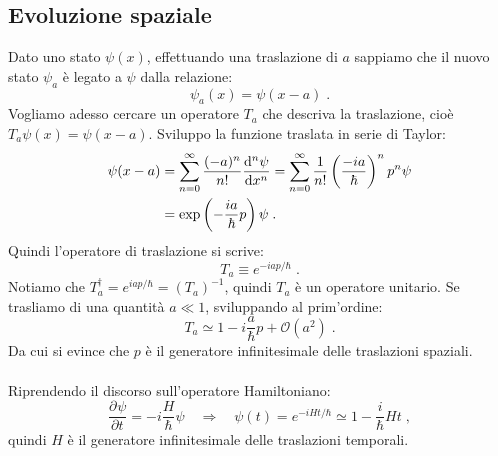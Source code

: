 \documentclass[12pt,a4paper]{report}
\theoremstyle{definition}
\newcommand{\pdev}[3][]{\frac{\partial^{#1} #2}{\partial #3^{#1}}}
\newcommand{\dev}[3][]{\frac{\mathrm{d}^{#1} #2}{\mathrm{d} #3^{#1}}}
\numberwithin{equation}{section}
\begin{document}
\subsection{Evoluzione spaziale}
Dato uno stato $\psi(x)$, effettuando una traslazione di $a$ sappiamo che il nuovo stato $\psi_a$ è legato a $\psi$ dalla relazione:
$$
\psi_a(x)=\psi(x-a)\;.
$$
Vogliamo adesso cercare un operatore $T_a$ che descriva la traslazione, cioè $T_a\psi(x)=\psi(x-a)$. Sviluppo la funzione traslata in serie di Taylor:
\begin{align}
\psi(x-a)&=\sum_{n=0}^{\infty} \frac{(-a)^n}{n!}\dev[n]{\psi}{x}=\sum_{n=0}^{\infty}\frac{1}{n!}\left(\frac{-ia}{\hbar}\right)^np^n\psi \notag \\
&=\exp\left(-\frac{ia}{\hbar}p\right)\psi\;.
\end{align}
Quindi l'operatore di traslazione si scrive:
\begin{equation}
T_a\equiv e^{-iap/\hbar}\;.
\end{equation}
Notiamo che $T_a^{\dagger}=e^{iap/\hbar}=(T_a)^{-1}$, quindi $T_a$ è un operatore unitario. Se trasliamo di una quantità $a\ll 1$, sviluppando al prim'ordine:
\begin{equation}
T_a\simeq 1-i\frac{a}{\hbar}p+\mathcal{O}(a^2)\;.
\end{equation}
Da cui si evince che $p$ è il generatore infinitesimale delle traslazioni spaziali. \\
\\
Riprendendo il discorso sull'operatore Hamiltoniano:
$$
\pdev{\psi}{t}=-i\frac{H}{\hbar}\psi\quad \Longrightarrow \quad \psi(t)=e^{-iH t/\hbar}\simeq 1-\frac{i}{\hbar}H t\;,
$$
quindi $H$ è il generatore infinitesimale delle traslazioni temporali.
\end{document}

